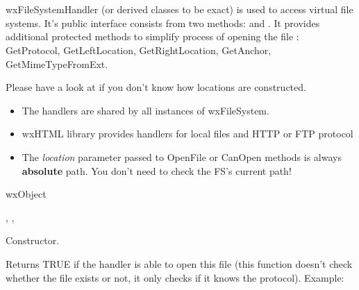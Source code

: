 %
%


\section{}\label{wxfilesystemhandler}

wxFileSystemHandler (or derived classes to be exact) is used
to access virtual file systems. It's public interface consists
from two methods: 
and . 
It provides additional protected methods to simplify process
of opening the file : GetProtocol, GetLeftLocation, GetRightLocation,
GetAnchor, GetMimeTypeFromExt.

Please have a look at  if you don't know how locations
are constructed.



\begin{itemize}
\item The handlers are shared by all instances of wxFileSystem.

\item wxHTML library provides handlers for local files and HTTP or FTP protocol

\item The {\it location} parameter passed to OpenFile or CanOpen methods
is always {\bf absolute} path. You don't need to check the FS's current path!
\end{itemize}


wxObject


,
,


\label{wxfilesystemhandlerwxfilesystemhandler}


Constructor.

\label{wxfilesystemhandlercanopen}


Returns TRUE if the handler is able to open this file (this function doesn't
check whether the file exists or not, it only checks if it knows the protocol).
Example:

